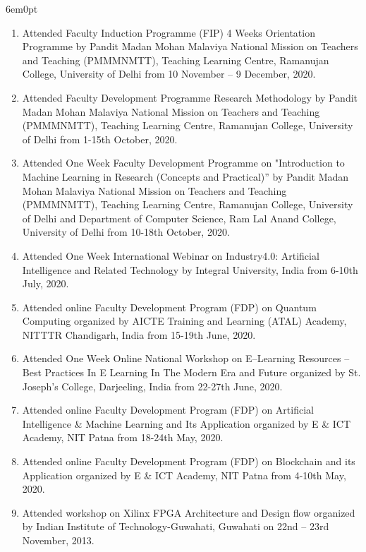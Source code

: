\documentclass[11pt,a4paper]{moderncv}
\begin{document}
\begin{adjustwidth}{6em}{0pt}
\begin{enumerate}
		\item Attended Faculty Induction Programme (FIP) 4 Weeks Orientation Programme by Pandit Madan Mohan Malaviya National Mission on Teachers and Teaching (PMMMNMTT), Teaching Learning Centre, Ramanujan College, University of Delhi from 10 November – 9 December, 2020.
		
		\item Attended Faculty Development Programme Research Methodology by Pandit Madan Mohan Malaviya National Mission on Teachers and Teaching (PMMMNMTT), Teaching Learning Centre, Ramanujan College, University of Delhi from 1-15th October, 2020.
		
		\item Attended One Week Faculty Development Programme on "Introduction to Machine Learning in Research (Concepts and Practical)” by Pandit Madan Mohan Malaviya National Mission on Teachers and Teaching (PMMMNMTT), Teaching Learning Centre, Ramanujan College, University of Delhi and Department of Computer Science, Ram Lal Anand College, University of Delhi from 10-18th October, 2020.
		
		\item Attended One Week International Webinar on Industry4.0: Artificial Intelligence and Related Technology by Integral University, India from 6-10th July, 2020.
		
		\item Attended online Faculty Development Program (FDP) on Quantum Computing organized by AICTE Training and Learning (ATAL) Academy, NITTTR Chandigarh, India from 15-19th June, 2020.
		
		\item Attended One Week Online National Workshop on E–Learning Resources – Best Practices In E Learning In The Modern Era and Future organized by St. Joseph’s College, Darjeeling, India from 22-27th June, 2020.
		
		\item Attended online Faculty Development Program (FDP) on Artificial Intelligence \& Machine Learning and Its Application organized by E \& ICT Academy, NIT Patna from 18-24th May, 2020.
		
		\item Attended online Faculty Development Program (FDP) on Blockchain and its Application organized by E \& ICT Academy, NIT Patna from 4-10th May, 2020.
		
		\item Attended workshop on Xilinx FPGA Architecture and Design flow organized by Indian Institute of Technology-Guwahati, Guwahati on 22nd – 23rd November, 2013.
		

\end{enumerate}
\end{adjustwidth}
\end{document}
